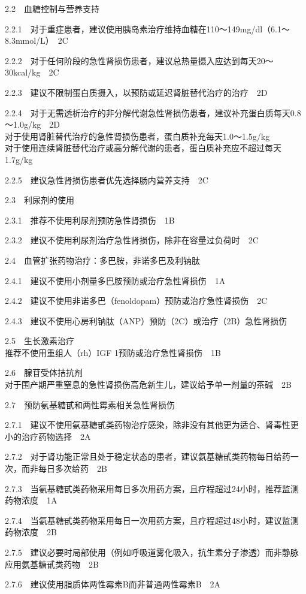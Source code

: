 2.2　血糖控制与营养支持

2.2.1　对于重症患者，建议使用胰岛素治疗维持血糖在110～149mg/dl（6.1～8.3mmol/L）　2C

2.2.2　对于任何阶段的急性肾损伤患者，建议总热量摄入应达到每天20～30kcal/kg　2C

2.2.3　建议不限制蛋白质摄入，以预防或延迟肾脏替代治疗的治疗　2D

2.2.4　对于无需透析治疗的非分解代谢急性肾损伤患者，建议补充蛋白质每天0.8～1.0g/kg　2D\\
对于使用肾脏替代治疗的急性肾损伤患者，蛋白质补充每天1.0～1.5g/kg\\
对于使用连续肾脏替代治疗或高分解代谢的患者，蛋白质补充应不超过每天1.7g/kg

2.2.5　建议急性肾损伤患者优先选择肠内营养支持　2C

2.3　利尿剂的使用

2.3.1　推荐不使用利尿剂预防急性肾损伤　1B

2.3.2　建议不使用利尿剂治疗急性肾损伤，除非在容量过负荷时　2C

2.4　血管扩张药物治疗：多巴胺，非诺多巴及利钠肽

2.4.1　建议不使用小剂量多巴胺预防或治疗急性肾损伤　1A

2.4.2　建议不使用非诺多巴（fenoldopam）预防或治疗急性肾损伤　2C

2.4.3　建议不使用心房利钠肽（ANP）预防（2C）或治疗（2B）急性肾损伤

2.5　生长激素治疗\\
推荐不使用重组人（rh）IGF 1预防或治疗急性肾损伤　1B

2.6　腺苷受体拮抗剂\\
对于围产期严重窒息的急性肾损伤高危新生儿，建议给予单一剂量的茶碱　2B

2.7　预防氨基糖甙和两性霉素相关急性肾损伤

2.7.1　建议不使用氨基糖甙类药物治疗感染，除非没有其他更为适合、肾毒性更小的治疗药物选择　2A

2.7.2　对于肾功能正常且处于稳定状态的患者，建议氨基糖甙类药物每日给药一次，而非每日多次给药　2B

2.7.3　当氨基糖甙类药物采用每日多次用药方案，且疗程超过24小时，推荐监测药物浓度　1A

2.7.4　当氨基糖甙类药物采用每日一次用药方案，且疗程超过48小时，建议监测药物浓度　2B

2.7.5　建议必要时局部使用（例如呼吸道雾化吸入，抗生素分子渗透）而非静脉应用氨基糖甙类药物　2B

2.7.6　建议使用脂质体两性霉素B而非普通两性霉素B　2A


